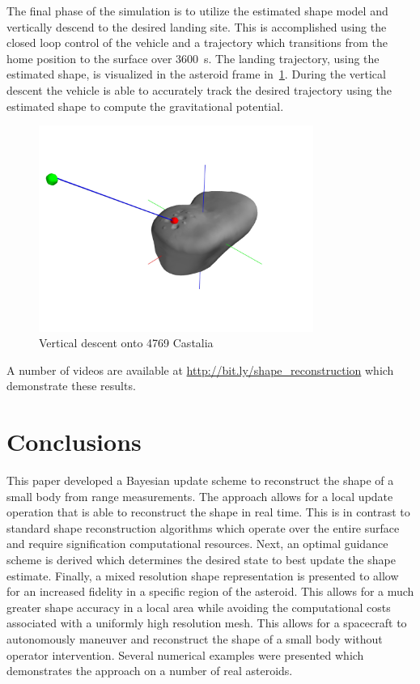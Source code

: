 \documentclass[journal]{new-aiaa}
\newcommand{\todo}[1]{\vspace{5 mm}\par \noindent
\marginpar{\textsc{ToDo}} \framebox{\begin{minipage}[c]{0.95
\textwidth} \tt #1 \end{minipage}}\vspace{5 mm}\par}
\begin{document}
The final phase of the simulation is to utilize the estimated shape model and vertically descend to the desired landing site. 
This is accomplished using the closed loop control of the vehicle and a trajectory which transitions from the home position to the surface over \SI{3600}{\second}.
The landing trajectory, using the estimated shape, is visualized in the asteroid frame in~\cref{fig:castalia_landing}.
During the vertical descent the vehicle is able to accurately track the desired trajectory using the estimated shape to compute the gravitational potential.
\begin{figure}[htbp]
    \centering
    \includegraphics[width=0.8\textwidth]{dynamic_exploration_castalia_land_asteroid_trajectory.jpg}
    \caption{Vertical descent onto 4769 Castalia~\label{fig:castalia_landing}}
\end{figure}
A number of videos are available at \url{http://bit.ly/shape_reconstruction} which demonstrate these results.

\section{Conclusions}

This paper developed a Bayesian update scheme to reconstruct the shape of a small body from range measurements. 
The approach allows for a local update operation that is able to reconstruct the shape in real time. 
This is in contrast to standard shape reconstruction algorithms which operate over the entire surface and require signification computational resources.
Next, an optimal guidance scheme is derived which determines the desired state to best update the shape estimate. 
Finally, a mixed resolution shape representation is presented to allow for an increased fidelity in a specific region of the asteroid.
This allows for a much greater shape accuracy in a local area while avoiding the computational costs associated with a uniformly high resolution mesh.
This allows for a spacecraft to autonomously maneuver and reconstruct the shape of a small body without operator intervention.
Several numerical examples were presented which demonstrates the approach on a number of real asteroids.
\end{document}
